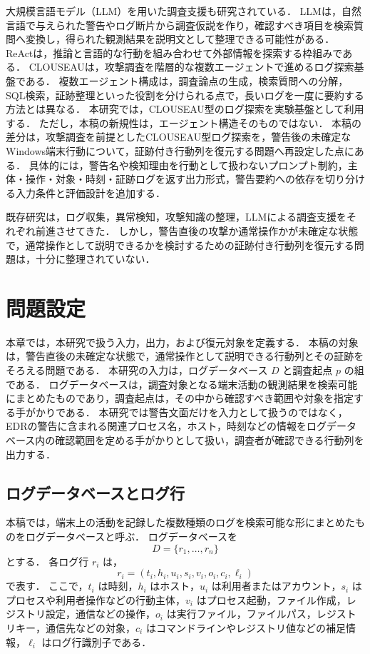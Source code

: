 \documentclass[a4paper,twocolumn,10pt]{article}
\begin{document}
大規模言語モデル（LLM）を用いた調査支援も研究されている．
LLMは，自然言語で与えられた警告やログ断片から調査仮説を作り，確認すべき項目を検索質問へ変換し，得られた観測結果を説明文として整理できる可能性がある．
ReAct\cite{react}は，推論と言語的な行動を組み合わせて外部情報を探索する枠組みである．
CLOUSEAU\cite{clouseau}は，攻撃調査を階層的な複数エージェントで進めるログ探索基盤である．
複数エージェント構成は，調査論点の生成，検索質問への分解，SQL検索，証跡整理といった役割を分けられる点で，長いログを一度に要約する方法とは異なる．
本研究では，CLOUSEAU型のログ探索を実験基盤として利用する．
ただし，本稿の新規性は，エージェント構造そのものではない．
本稿の差分は，攻撃調査を前提としたCLOUSEAU型ログ探索を，警告後の未確定なWindows端末行動について，証跡付き行動列を復元する問題へ再設定した点にある．
具体的には，警告名や検知理由を行動として扱わないプロンプト制約，主体・操作・対象・時刻・証跡ログを返す出力形式，警告要約への依存を切り分ける入力条件と評価設計を追加する．

既存研究は，ログ収集，異常検知，攻撃知識の整理，LLMによる調査支援をそれぞれ前進させてきた．
しかし，警告直後の攻撃か通常操作かが未確定な状態で，通常操作として説明できるかを検討するための証跡付き行動列を復元する問題は，十分に整理されていない．

\section{問題設定}
\label{sec:problem}

本章では，本研究で扱う入力，出力，および復元対象を定義する．
本稿の対象は，警告直後の未確定な状態で，通常操作として説明できる行動列とその証跡をそろえる問題である．
本研究の入力は，ログデータベース \(D\) と調査起点 \(p\) の組である．
ログデータベースは，調査対象となる端末活動の観測結果を検索可能にまとめたものであり，調査起点は，その中から確認すべき範囲や対象を指定する手がかりである．
本研究では警告文面だけを入力として扱うのではなく，EDRの警告に含まれる関連プロセス名，ホスト，時刻などの情報をログデータベース内の確認範囲を定める手がかりとして扱い，調査者が確認できる行動列を出力する．

\subsection{ログデータベースとログ行}

本稿では，端末上の活動を記録した複数種類のログを検索可能な形にまとめたものをログデータベースと呼ぶ．
ログデータベースを
\[
D=\{r_1,\ldots,r_n\}
\]
とする．
各ログ行 \(r_i\) は，
\[
r_i=(t_i,h_i,u_i,s_i,v_i,o_i,c_i,\ell_i)
\]
で表す．
ここで，\(t_i\) は時刻，\(h_i\) はホスト，\(u_i\) は利用者またはアカウント，\(s_i\) はプロセスや利用者操作などの行動主体，\(v_i\) はプロセス起動，ファイル作成，レジストリ設定，通信などの操作，\(o_i\) は実行ファイル，ファイルパス，レジストリキー，通信先などの対象，\(c_i\) はコマンドラインやレジストリ値などの補足情報，\(\ell_i\) はログ行識別子である．
\end{document}
